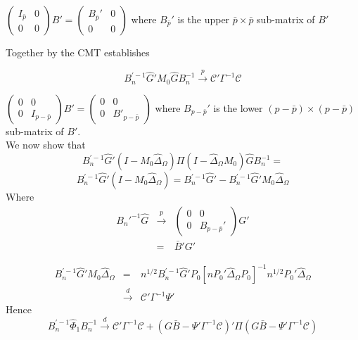 \documentclass[11pt, fleqn]{article}
\begin{document}
 
  $ \left(\begin{array}{cc} I_{\bar{p}} & 0\\ 0 & 0\end{array}\right)B'=\left(\begin{array}{cc} B_{\bar{p}}' & 0\\ 0 & 0\end{array}\right)$ where $B_{\bar{p}}'$ is the upper $\bar{p}\times \bar{p}$ sub-matrix of $B'$ 
 
 Together by the CMT establishes
 
  \begin{equation}
  B_n^{'-1}\hat{G}'M_0\hat{G} B_n^{-1}\overset{p}{\rightarrow} \mathcal{C}'\Gamma^{-1}\mathcal{C}
  \end{equation}
  
   $\left(\begin{array}{cc} 0 & 0\\ 0 & I_{p-\bar{p}}\end{array}\right) B'= \left(\begin{array}{cc} 0 & 0\\ 0 & B'_{p-\bar{p}}\end{array}\right)$ where $B_{p-\bar{p}}'$ is the lower $(p-\bar{p})\times(p- \bar{p})$ sub-matrix of $B'$.\\
 
 
 We now show that 
 \begin{equation} B_n^{'-1}\hat{G}'(I-M_0\hat{\Delta}_{\Omega})\Pi(I-\hat{\Delta}_{\Omega}M_0)\hat{G}B_n^{-1}= \end{equation}
   \begin{equation} B_n^{'-1}\hat{G}'(I-M_0\hat{\Delta}_{\Omega})= B_n^{'-1}\hat{G}' -B_n^{'-1}\hat{G}'M_0\hat{\Delta}_{\Omega} \end{equation}
 Where 
 \begin{eqnarray}
 B_n'^{-1}\hat{G}&\overset{p}{\rightarrow}& \left(\begin{array}{cc} 0 & 0\\ 0 & B_{p-\bar{p}}'\end{array}\right)G'\\
 &=& \bar{B}'G'
 \end{eqnarray}
 
  \begin{eqnarray}
 B_n^{'-1}\hat{G}'M_0\hat{\Delta}_{\Omega}&=&n^{1/2}B_n^{'-1}\hat{G}'P_0[nP_0'\hat{\Delta}_{\Omega}P_0]^{-1}n^{1/2}P_0'\hat{\Delta}_{\Omega}\\
 &\overset{d}{\rightarrow}& \mathcal{C}'\Gamma^{-1} \Psi'
  \end{eqnarray}
  Hence
 \begin{equation} B_n^{'-1}\hat{\Phi}_1B_n^{-1}
 \overset{d}{\rightarrow} \mathcal{C}'\Gamma^{-1}\mathcal{C}+  (G\bar{B}-\Psi'\Gamma^{-1}\mathcal{C})'\Pi(G\bar{B}-\Psi'\Gamma^{-1}\mathcal{C}) \end{equation}
\end{document}
